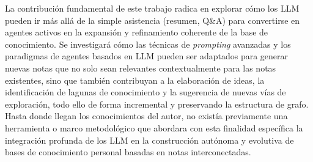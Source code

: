 La contribución fundamental de este trabajo radica en explorar cómo los LLM pueden ir más allá de la simple asistencia (resumen, Q\&A) para convertirse en agentes activos en la expansión y refinamiento coherente de la base de conocimiento. Se investigará cómo las técnicas de \textit{prompting} avanzadas y los paradigmas de agentes basados en LLM pueden ser adaptados para generar nuevas notas que no solo sean relevantes contextualmente para las notas existentes, sino que también contribuyan a la elaboración de ideas, la identificación de lagunas de conocimiento y la sugerencia de nuevas vías de exploración, todo ello de forma incremental y preservando la estructura de grafo. Hasta donde llegan los conocimientos del autor, no existía previamente una herramienta o marco metodológico que abordara con esta finalidad específica la integración profunda de los LLM en la construcción autónoma y evolutiva de bases de conocimiento personal basadas en notas interconectadas.